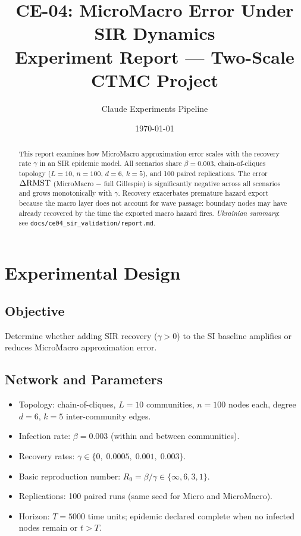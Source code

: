 \documentclass[11pt,a4paper]{article}
\title{CE-04: MicroMacro Error Under SIR Dynamics\\
       \large Experiment Report --- Two-Scale CTMC Project}
\author{Claude Experiments Pipeline}
\date{\today}
\begin{document}
\maketitle

\begin{abstract}
This report examines how MicroMacro approximation error scales with the
recovery rate $\gamma$ in an SIR epidemic model.
All scenarios share $\beta = 0.003$, chain-of-cliques topology
($L=10$, $n=100$, $d=6$, $k=5$), and 100 paired replications.
The error $\Delta\mathrm{RMST}$ (MicroMacro $-$ full Gillespie) is significantly negative
across all scenarios and grows monotonically with $\gamma$.
Recovery exacerbates premature hazard export because the macro layer
does not account for wave passage: boundary nodes may have already
recovered by the time the exported macro hazard fires.
\textit{Ukrainian summary}: see \texttt{docs/ce04\_sir\_validation/report.md}.
\end{abstract}

\section{Experimental Design}

\subsection{Objective}
Determine whether adding SIR recovery ($\gamma > 0$) to the SI baseline
amplifies or reduces MicroMacro approximation error.

\subsection{Network and Parameters}
\begin{itemize}
  \item Topology: chain-of-cliques, $L=10$ communities, $n=100$ nodes each,
        degree $d=6$, $k=5$ inter-community edges.
  \item Infection rate: $\beta = 0.003$ (within and between communities).
  \item Recovery rates: $\gamma \in \{0,\; 0.0005,\; 0.001,\; 0.003\}$.
  \item Basic reproduction number: $R_0 = \beta/\gamma \in \{\infty, 6, 3, 1\}$.
  \item Replications: 100 paired runs (same seed for Micro and MicroMacro).
  \item Horizon: $T = 5000$ time units; epidemic declared complete
        when no infected nodes remain or $t > T$.
\end{itemize}
\end{document}
